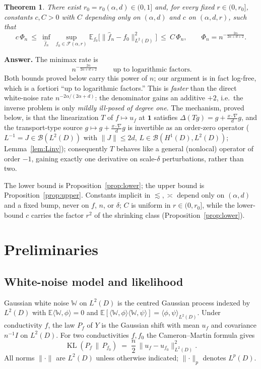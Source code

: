 \documentclass[11pt]{article}
\newtheorem{theorem}{Theorem}[section]
\theoremstyle{remark}
\newcommand{\E}{\mathbb{E}}
\newcommand{\F}{\mathcal{F}}
\newcommand{\W}{\mathbb{W}}
\newcommand{\one}{\mathbf{1}}
\newcommand{\norm}[1]{\lVert #1\rVert}
\newcommand{\inner}[2]{\langle #1,#2\rangle}
\begin{document}
\begin{theorem}\label{thm:main}
There exist $r_{0}=r_{0}(\alpha,d)\in(0,1]$ and, for every fixed
$r\in(0,r_{0}]$, constants $c,C>0$ with $C$ depending only on
$(\alpha,d)$ and $c$ on $(\alpha,d,r)$, such that
\[
c\,\Phi_{n}
\ \le\
\inf_{\widehat f_{n}}\ \sup_{f_{0}\in\F(\alpha,r)}
\E_{f_{0}}\!\bigl[\norm{\widehat f_{n}-f_{0}}_{L^{2}(D)}^{2}\bigr]
\ \le\ C\,\Phi_{n},
\qquad
\Phi_{n}=n^{-\frac{2\alpha}{2\alpha+d+2}} .
\]
\end{theorem}

\noindent\textbf{Answer.} The minimax rate is
\[
\boxed{\ n^{-\frac{2\alpha}{2\alpha+d+2}}\ }
\qquad\text{up to logarithmic factors.}
\]
Both bounds proved below carry this power of $n$; our argument is in fact
log-free, which is a fortiori ``up to logarithmic factors.'' This is
\emph{faster} than the
direct white-noise rate $n^{-2\alpha/(2\alpha+d)}$: the denominator gains
an additive $+2$, i.e.\ the inverse problem is only \emph{mildly ill-posed
of degree one}. The mechanism, proved below, is that the linearization $T$
of $f\mapsto u_{f}$ at $\one$ satisfies $\Delta(Tg)=g+\frac{x\cdot\nabla}{d}g$,
and the transport-type source $g\mapsto g+\frac{x\cdot\nabla}{d}g$ is
invertible as an order-zero operator ($L^{-1}=J\in\mathcal B(L^{2}(D))$ with
$\norm{J}\le2d$, $L\in\mathcal B(H^{1}(D),L^{2}(D))$;
Lemma~\ref{lem:Linv}); consequently $T$
behaves like a general (nonlocal) operator of order $-1$, gaining exactly
one derivative on scale-$\delta$ perturbations, rather than two.

\noindent The lower bound is Proposition~\ref{prop:lower}; the upper bound
is Proposition~\ref{prop:upper}. Constants implicit in $\lesssim,\asymp$ depend only on
$(\alpha,d)$ and a fixed bump, never on $f$, $n$, or $\delta$; $C$ is
uniform in $r\in(0,r_0]$, while the lower-bound $c$ carries the factor
$r^{2}$ of the shrinking class (Proposition~\ref{prop:lower}).

\section{Preliminaries}\label{sec:prelim}

\subsection{White-noise model and likelihood}
Gaussian white noise $\W$ on $L^{2}(D)$ is the centred Gaussian process
indexed by $L^{2}(D)$ with
$\E\inner{\W}{\phi}=0$ and
$\E[\inner{\W}{\phi}\inner{\W}{\psi}]=\inner{\phi}{\psi}_{L^{2}(D)}$. Under
conductivity $f$, the law $P_{f}$ of $Y$ is the Gaussian shift with mean
$u_{f}$ and covariance $n^{-1}I$ on $L^{2}(D)$. For two conductivities
$f,f_0$ the Cameron--Martin formula gives
\begin{equation}\label{eq:KL}
\operatorname{KL}(P_{f}\,\|\,P_{f_{0}})
\;=\;\frac{n}{2}\,\norm{u_{f}-u_{f_{0}}}_{L^{2}(D)}^{2}.
\end{equation}
All norms $\norm{\cdot}$ are $L^{2}(D)$ unless otherwise indicated;
$\norm{\cdot}_{p}$ denotes $L^{p}(D)$.
\end{document}
